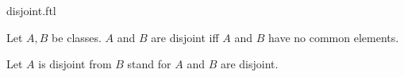 \documentclass{article}
\begin{document}
\begin{smodule}[creators={Marcel Schütz}]{disjoint.ftl}

  \begin{fdefinition*}[label=4981913324355584]
    Let $A, B$ be classes.
    $A$ and $B$ are disjoint iff $A$ and $B$ have no common elements.

    Let $A$ is disjoint from $B$ stand for $A$ and $B$ are disjoint.
  \end{fdefinition*}
\end{smodule}
\end{document}
